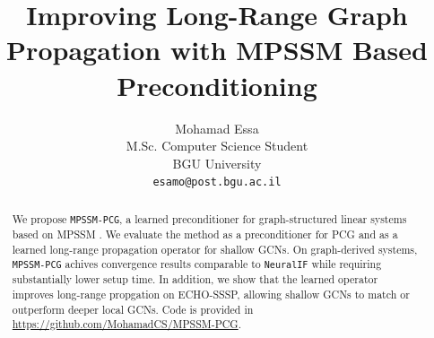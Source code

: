 \documentclass{article}
\title{Improving Long-Range Graph Propagation with MPSSM Based Preconditioning}
\author{ Mohamad Essa\\
  M.Sc. Computer Science Student\\
  BGU University\\
  \texttt{esamo@post.bgu.ac.il}\\ 
}
\begin{document}
\maketitle
\begin{abstract}
    We propose \texttt{MPSSM-PCG}, a learned preconditioner for
    graph-structured linear systems based on MPSSM
    \cite{ceniMessagePassingStateSpaceModels2025}. We evaluate the method as a
    preconditioner for PCG and as a learned long-range propagation operator for
    shallow GCNs. On graph-derived systems, \texttt{MPSSM-PCG} achives
    convergence results comparable to
    \texttt{NeuralIF}\cite{hausnerNeuralIncompleteFactorization2024} while
    requiring substantially lower setup time. In addition, we show that the
    learned operator improves long-range propgation on ECHO-SSSP, allowing
    shallow GCNs to match or outperform deeper local GCNs. Code is provided in \url{https://github.com/MohamadCS/MPSSM-PCG}.
\end{abstract}











\end{document}
